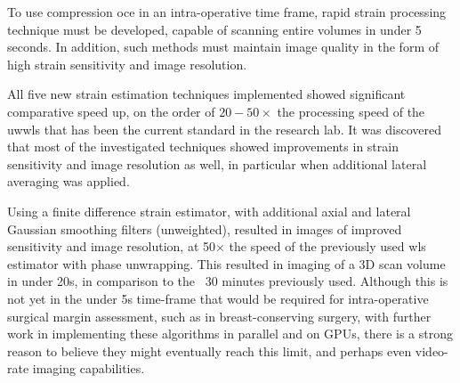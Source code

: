 To use compression \ac{oce} in an intra-operative time frame, rapid strain processing technique must be developed, capable of scanning entire volumes in under 5 seconds. In addition, such methods must maintain image quality in the form of high strain sensitivity and image resolution. 

All five new strain estimation techniques implemented showed significant comparative speed up, on the order of $20-50\times$ the processing speed of the \ac{uwwls} that has been the current standard in the research lab. It was discovered that most of the investigated techniques showed improvements in strain sensitivity and image resolution as well, in particular when additional lateral averaging was applied. 

Using a finite difference strain estimator, with additional axial and lateral Gaussian smoothing filters (unweighted), resulted in images of improved sensitivity and image resolution, at 50$\times$ the speed of the previously used \ac{wls} estimator with phase unwrapping. This resulted in imaging of a 3D scan volume in under 20s, in comparison to the ~30 minutes previously used. Although this is not yet in the under 5s time-frame that would be required for intra-operative surgical margin assessment, such as in breast-conserving surgery, with further work in implementing these algorithms in parallel and on GPUs, there is a strong reason to believe they might eventually reach this limit, and perhaps even video-rate imaging capabilities. 

